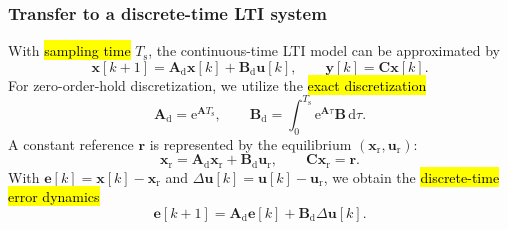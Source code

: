 \begin{frame}
	\frametitle{Transfer to a discrete-time LTI system}
	With \hl{sampling time} $T_{\mathrm{s}}$, the continuous-time LTI model can be approximated by
	\begin{equation}
		\bm{x}[k+1]=\bm{A}_{\mathrm{d}}\bm{x}[k]+
		\bm{B}_{\mathrm{d}}\bm{u}[k],
		\qquad
		\bm{y}[k]=\bm{C}\bm{x}[k].
	\end{equation}\pause%
	For zero-order-hold discretization, we utilize the \hl{exact discretization}
	\begin{equation}
		\bm{A}_{\mathrm{d}}=\mathrm{e}^{\bm{A}T_{\mathrm{s}}},
		\qquad
		\bm{B}_{\mathrm{d}}=\int_0^{T_{\mathrm{s}}}\mathrm{e}^{\bm{A}\tau}\bm{B}\,\mathrm{d}\tau .
	\end{equation}\pause%
	A constant reference $\bm{r}$ is represented by the equilibrium $(\bm{x}_{\mathrm{r}},\bm{u}_{\mathrm{r}})$:
	\begin{equation}
		\bm{x}_{\mathrm{r}}=\bm{A}_{\mathrm{d}}\bm{x}_{\mathrm{r}}+
		\bm{B}_{\mathrm{d}}\bm{u}_{\mathrm{r}},
		\qquad
		\bm{C}\bm{x}_{\mathrm{r}}=\bm{r}.
	\end{equation}\pause%
	With $\bm{e}[k]=\bm{x}[k]-\bm{x}_{\mathrm{r}}$ and $\Delta\bm{u}[k]=\bm{u}[k]-\bm{u}_{\mathrm{r}}$, we obtain the \hl{discrete-time error dynamics}
	\begin{equation}
		\boxed{\bm{e}[k+1]=\bm{A}_{\mathrm{d}}\bm{e}[k]+\bm{B}_{\mathrm{d}}\Delta\bm{u}[k].}
	\end{equation}
\end{frame}

